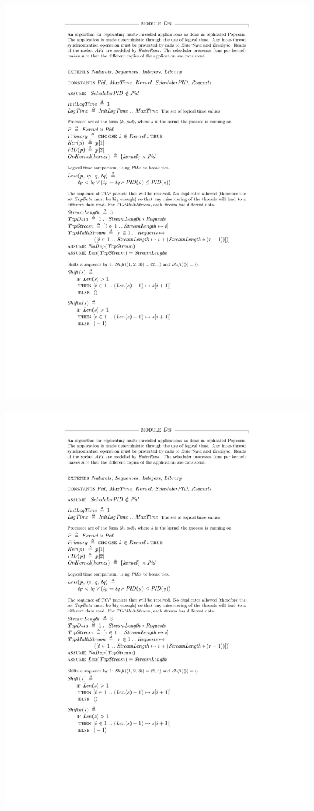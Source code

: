 \documentclass[12pt]{report}
\begin{document}
\hspace{-2.5cm}\includegraphics[page=4,scale=1]{tla/Det.pdf}

\hspace{-2.5cm}\includegraphics[page=5,scale=1]{tla/Det.pdf}

\end{document}
